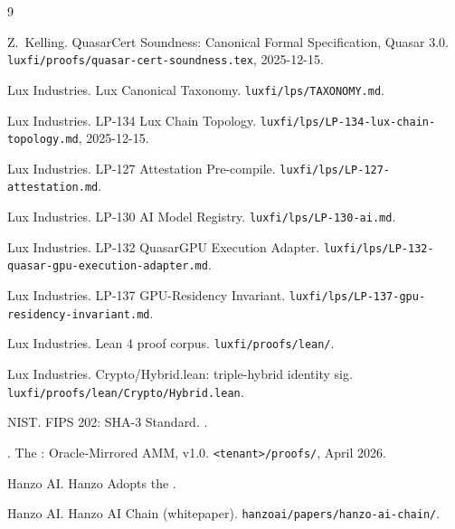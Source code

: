 \documentclass[11pt]{article}
\begin{document}
\begin{thebibliography}{9}

Z.~Kelling.
\newblock QuasarCert Soundness: Canonical Formal Specification, Quasar 3.0.
\newblock \texttt{luxfi/proofs/quasar-cert-soundness.tex}, 2025-12-15.

Lux Industries.
\newblock Lux Canonical Taxonomy.
\newblock \texttt{luxfi/lps/TAXONOMY.md}.

Lux Industries.
\newblock LP-134 Lux Chain Topology.
\newblock \texttt{luxfi/lps/LP-134-lux-chain-topology.md}, 2025-12-15.

Lux Industries.
\newblock LP-127 Attestation Pre-compile.
\newblock \texttt{luxfi/lps/LP-127-attestation.md}.

Lux Industries.
\newblock LP-130 AI Model Registry.
\newblock \texttt{luxfi/lps/LP-130-ai.md}.

Lux Industries.
\newblock LP-132 QuasarGPU Execution Adapter.
\newblock \texttt{luxfi/lps/LP-132-quasar-gpu-execution-adapter.md}.

Lux Industries.
\newblock LP-137 GPU-Residency Invariant.
\newblock \texttt{luxfi/lps/LP-137-gpu-residency-invariant.md}.

Lux Industries.
\newblock Lean 4 proof corpus.
\newblock \texttt{luxfi/proofs/lean/}.

Lux Industries.
\newblock Crypto/Hybrid.lean: triple-hybrid identity sig.
\newblock \texttt{luxfi/proofs/lean/Crypto/Hybrid.lean}.

NIST.
\newblock FIPS 202: SHA-3 Standard.
.

.
\newblock The : Oracle-Mirrored AMM, v1.0.
\newblock \texttt{<tenant>/proofs/}, April 2026.

Hanzo AI.
\newblock Hanzo Adopts the .


Hanzo AI.
\newblock Hanzo AI Chain (whitepaper).
\newblock \texttt{hanzoai/papers/hanzo-ai-chain/}.

\end{thebibliography}
\end{document}
